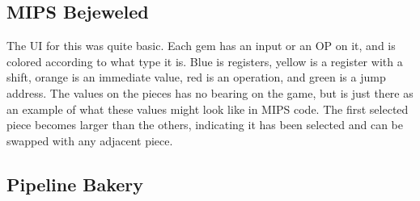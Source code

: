 \documentclass[12pt]{article}
\begin{document}
	\subsection{MIPS Bejeweled}
	The UI for this was quite basic. Each gem has an input or an OP on it, and is colored according to what type it is. Blue is registers, yellow is a register with a shift, orange is an immediate value, red is an operation, and green is a jump address. The values on the pieces has no bearing on the game, but is just there as an example of what these values might look like in MIPS code. The first selected piece becomes larger than the others, indicating it has been selected and can be swapped with any adjacent piece.
	\subsection{Pipeline Bakery}
\end{document}
